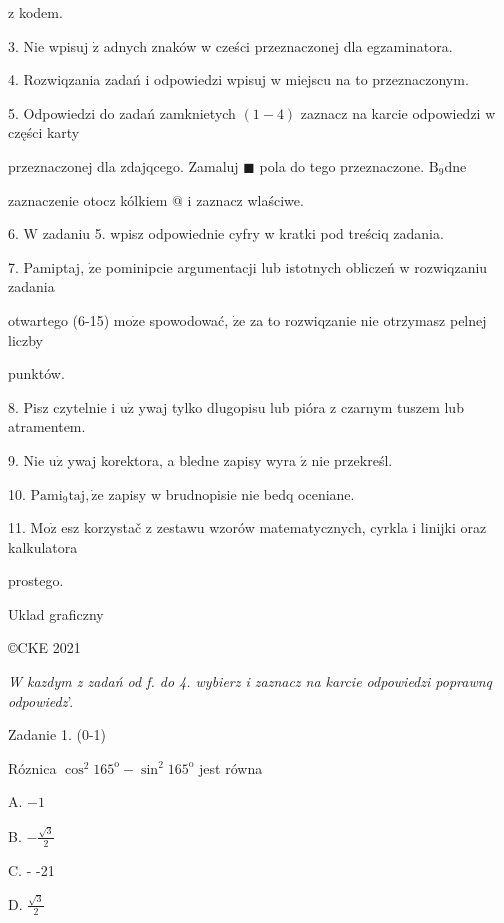 \documentclass[a4paper,12pt]{article}
\begin{document}
z kodem.

3. Nie wpisuj $\dot{\mathrm{z}}$ adnych znaków w cześci przeznaczonej dla egzaminatora.

4. Rozwiqzania zadań i odpowiedzi wpisuj w miejscu na to przeznaczonym.

5. Odpowiedzi do zadań zamknietych $(1-4)$ zaznacz na karcie odpowiedzi w części karty

przeznaczonej dla zdajqcego. Zamaluj $\blacksquare$ pola do tego przeznaczone. $\mathrm{B}_{9}\mathrm{d}\mathrm{n}\mathrm{e}$

zaznaczenie otocz kólkiem @ i zaznacz wlaściwe.

6. $\mathrm{W}$ zadaniu 5. wpisz odpowiednie cyfry w kratki pod treściq zadania.

7. Pamiptaj, $\dot{\mathrm{z}}\mathrm{e}$ pominipcie argumentacji lub istotnych obliczeń w rozwiqzaniu zadania

otwartego (6-15) $\mathrm{m}\mathrm{o}\dot{\mathrm{z}}\mathrm{e}$ spowodować, $\dot{\mathrm{z}}\mathrm{e}$ za to rozwiqzanie nie otrzymasz pelnej liczby

punktów.

8. Pisz czytelnie i $\mathrm{u}\dot{\mathrm{z}}$ ywaj tylko dlugopisu lub pióra z czarnym tuszem lub atramentem.

9. Nie $\mathrm{u}\dot{\mathrm{z}}$ ywaj korektora, a bledne zapisy wyra $\acute{\mathrm{z}}$ nie przekreśl.

10. $\mathrm{P}\mathrm{a}\mathrm{m}\mathrm{i}_{9}\mathrm{t}\mathrm{a}\mathrm{j}, \dot{\mathrm{z}}\mathrm{e}$ zapisy w brudnopisie nie bedq oceniane.

11. $\mathrm{M}\mathrm{o}\dot{\mathrm{z}}$ esz korzystač z zestawu wzorów matematycznych, cyrkla i linijki oraz kalkulatora

prostego.

Uklad graficzny

\copyright CKE 2021




{\it W kazdym z zadań od f. do 4. wybierz i zaznacz na karcie odpowiedzi poprawnq odpowiedz}'.

Zadanie 1. (0-1)

Róznica $\cos^{2}165^{\mathrm{o}}-\sin^{2}165^{\mathrm{o}}$ jest równa

A. $-1$

B. $-\displaystyle \frac{\sqrt{3}}{2}$

C. - -21

D. $\displaystyle \frac{\sqrt{3}}{2}$
\end{document}
